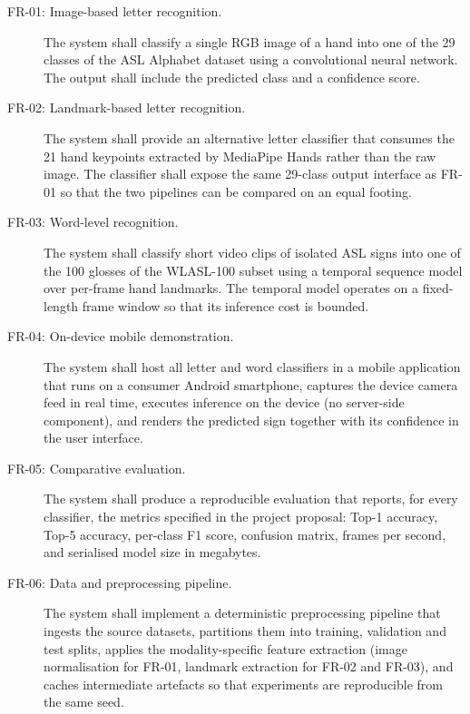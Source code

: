 \begin{description}
  \item[FR-01: Image-based letter recognition.] The system shall
        classify a single RGB image of a hand into one of the 29
        classes of the ASL Alphabet dataset using a convolutional
        neural network. The output shall include the predicted class
        and a confidence score.

  \item[FR-02: Landmark-based letter recognition.] The system
        shall provide an alternative letter classifier that consumes
        the 21 hand keypoints extracted by MediaPipe Hands rather
        than the raw image. The classifier shall expose the same
        29-class output interface as FR-01 so that the two pipelines
        can be compared on an equal footing.

  \item[FR-03: Word-level recognition.] The system shall
        classify short video clips of isolated ASL signs into one of
        the 100 glosses of the WLASL-100 subset using a temporal
        sequence model over per-frame hand landmarks. The temporal
        model operates on a fixed-length frame window so that its
        inference cost is bounded.

  \item[FR-04: On-device mobile demonstration.] The system shall
        host all letter and word classifiers in a mobile application
        that runs on a consumer Android smartphone, captures the
        device camera feed in real time, executes inference on the
        device (no server-side component), and renders the predicted
        sign together with its confidence in the user interface.

  \item[FR-05: Comparative evaluation.] The system shall produce
        a reproducible evaluation that reports, for every
        classifier, the metrics specified in the project proposal:
        Top-1 accuracy, Top-5 accuracy, per-class F1 score, confusion
        matrix, frames per second, and serialised model size in
        megabytes.

  \item[FR-06: Data and preprocessing pipeline.] The system
        shall implement a deterministic preprocessing pipeline that
        ingests the source datasets, partitions them into training,
        validation and test splits, applies the modality-specific
        feature extraction (image normalisation for FR-01, landmark
        extraction for FR-02 and FR-03), and caches intermediate
        artefacts so that experiments are reproducible from the same
        seed.
\end{description}

